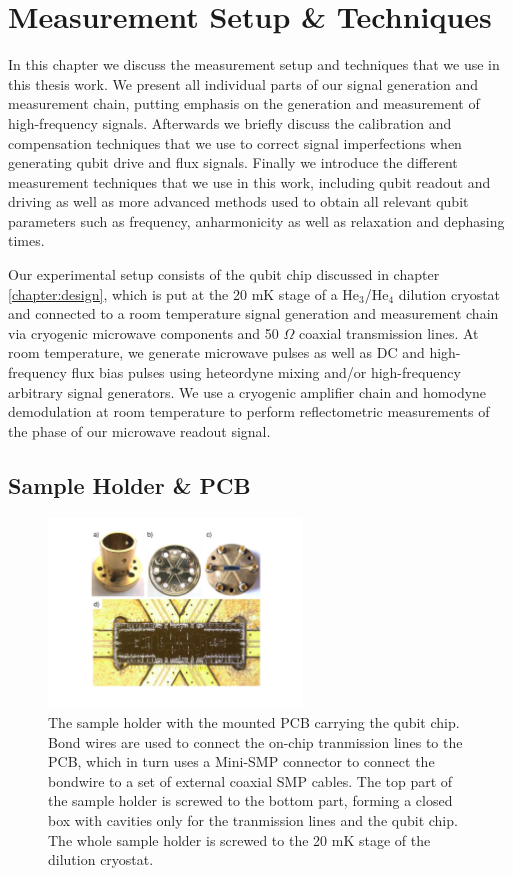 \chapter{Measurement Setup \& Techniques} \label{chapter:measurement}

In this chapter we discuss the measurement setup and techniques that we use in this thesis work. We present all individual parts of our signal generation and measurement chain, putting emphasis on the generation and measurement of high-frequency signals. Afterwards we briefly discuss the calibration and compensation techniques that we use to correct signal imperfections when generating qubit drive and flux signals. Finally we introduce the different measurement techniques that we use in this work, including qubit readout and driving as well as more advanced methods used to obtain all relevant qubit parameters such as frequency, anharmonicity as well as relaxation and dephasing times.

\smallskip

Our experimental setup consists of the qubit chip discussed in chapter \ref{chapter:design}, which is put at the 20 mK stage of a He$_3$/He$_4$ dilution cryostat and connected to a room temperature signal generation and measurement chain via cryogenic microwave components and 50 $\Omega$ coaxial transmission lines. At room temperature, we generate microwave pulses as well as DC and high-frequency flux bias pulses using heteordyne mixing and/or high-frequency arbitrary signal generators. We use a cryogenic amplifier chain and homodyne demodulation at room temperature to perform reflectometric measurements of the phase of our microwave readout signal.

\section{Sample Holder \& PCB}

\begin{figure}
	\centering
		\includegraphics[width=0.6\textwidth]{"./material/photos/sample holder/sample_holder"}
	\caption[]{The sample holder with the mounted PCB carrying the qubit chip. Bond wires are used to connect the on-chip tranmission lines to the PCB, which in turn uses a Mini-SMP connector to connect the bondwire to a set of external coaxial SMP cables. The top part of the sample holder is screwed to the bottom part, forming a closed box with cavities only for the tranmission lines and the qubit chip. The whole sample holder is screwed to the 20 mK stage of the dilution cryostat.}
	\label{fig:pcb_and_sample_holder}
\end{figure}

